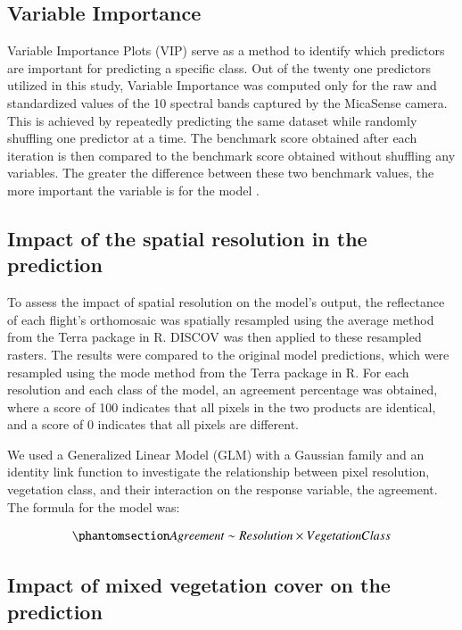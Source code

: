\documentclass[
  number]{elsarticle}
\begin{document}
\subsection{Variable Importance}\label{variable-importance}

Variable Importance Plots (VIP) serve as a method to identify which
predictors are important for predicting a specific class. Out of the
twenty one predictors utilized in this study, Variable Importance was
computed only for the raw and standardized values of the 10 spectral
bands captured by the MicaSense camera. This is achieved by repeatedly
predicting the same dataset while randomly shuffling one predictor at a
time. The benchmark score obtained after each iteration is then compared
to the benchmark score obtained without shuffling any variables. The
greater the difference between these two benchmark values, the more
important the variable is for the model \citep{WEI2015399}.

\subsection{Impact of the spatial resolution in the
prediction}\label{impact-of-the-spatial-resolution-in-the-prediction}

To assess the impact of spatial resolution on the model's output, the
reflectance of each flight's orthomosaic was spatially resampled using
the average method from the Terra package in R. DISCOV was then applied
to these resampled rasters. The results were compared to the original
model predictions, which were resampled using the mode method from the
Terra package in R. For each resolution and each class of the model, an
agreement percentage was obtained, where a score of 100 indicates that
all pixels in the two products are identical, and a score of 0 indicates
that all pixels are different.

We used a Generalized Linear Model (GLM) with a Gaussian family and an
identity link function to investigate the relationship between pixel
resolution, vegetation class, and their interaction on the response
variable, the agreement. The formula for the model was:

\begin{equation}\phantomsection\label{eq-gam}{
Agreement \sim  Resolution \times VegetationClass
}\end{equation}

\subsection{Impact of mixed vegetation cover on the
prediction}\label{impact-of-mixed-vegetation-cover-on-the-prediction}
\end{document}
